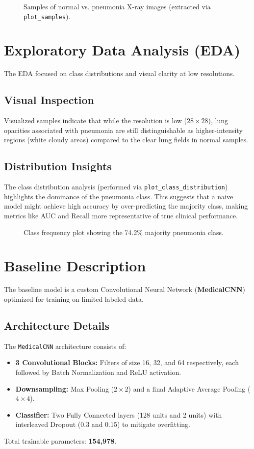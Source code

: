 \documentclass[a4paper,12pt]{article}
\begin{document}
\begin{figure}[h]
    \centering
    \caption{Samples of normal vs. pneumonia X-ray images (extracted via \texttt{plot\_samples}).}
\end{figure}

\newpage

\section{Exploratory Data Analysis (EDA)}
The EDA focused on class distributions and visual clarity at low resolutions.

\subsection{Visual Inspection}
Visualized samples indicate that while the resolution is low ($28 \times 28$), lung opacities associated with pneumonia are still distinguishable as higher-intensity regions (white cloudy areas) compared to the clear lung fields in normal samples.

\subsection{Distribution Insights}
The class distribution analysis (performed via \texttt{plot\_class\_distribution}) highlights the dominance of the pneumonia class. This suggests that a naive model might achieve high accuracy by over-predicting the majority class, making metrics like AUC and Recall more representative of true clinical performance.

\begin{figure}[h]
    \centering
    \caption{Class frequency plot showing the 74.2\% majority pneumonia class.}
\end{figure}

\section{Baseline Description}
The baseline model is a custom Convolutional Neural Network (\textbf{MedicalCNN}) optimized for training on limited labeled data.

\subsection{Architecture Details}
The \texttt{MedicalCNN} architecture consists of:
\begin{itemize}
    \item \textbf{3 Convolutional Blocks:} Filters of size 16, 32, and 64 respectively, each followed by Batch Normalization and ReLU activation.
    \item \textbf{Downsampling:} Max Pooling ($2\times2$) and a final Adaptive Average Pooling ($4\times4$).
    \item \textbf{Classifier:} Two Fully Connected layers (128 units and 2 units) with interleaved Dropout (0.3 and 0.15) to mitigate overfitting.
\end{itemize}
Total trainable parameters: \textbf{154,978}.
\end{document}
